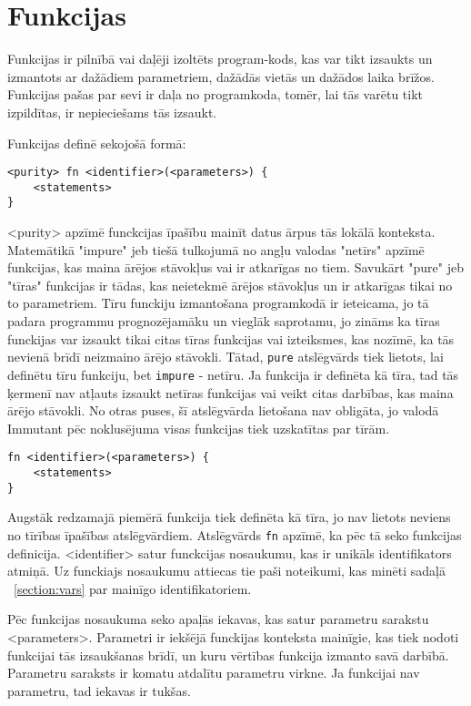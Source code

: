 \documentclass[12pt,a4paper]{report}
\begin{document}
\section{Funkcijas}
\label{section:functions}

Funkcijas ir pilnībā vai daļēji izoltēts program-kods, kas var tikt izsaukts un izmantots ar dažādiem parametriem, dažādās vietās un dažādos laika brīžos. Funkcijas pašas par sevi ir daļa no programkoda, tomēr, lai tās varētu tikt izpildītas, ir nepieciešams tās izsaukt. 

Funkcijas definē sekojošā formā:
\begin{verbatim}
<purity> fn <identifier>(<parameters>) {
    <statements>
}
\end{verbatim}

<purity> apzīmē funckcijas īpašību mainīt datus ārpus tās lokālā konteksta. Matemātikā "impure" jeb tiešā tulkojumā no angļu valodas "netīrs" apzīmē funkcijas, kas maina ārējos stāvokļus vai ir atkarīgas no tiem. Savukārt "pure" jeb "tīras" funkcijas ir tādas, kas neietekmē ārējos stāvokļus un ir atkarīgas tikai no to parametriem. Tīru funckiju izmantošana programkodā ir ieteicama, jo tā padara programmu prognozējamāku un vieglāk saprotamu, jo zināms ka tīras funckijas var izsaukt tikai citas tīras funkcijas vai izteiksmes, kas nozīmē, ka tās nevienā brīdī neizmaino ārējo stāvokli. Tātad, \texttt{pure} atslēgvārds tiek lietots, lai definētu tīru funkciju, bet \texttt{impure} - netīru. Ja funkcija ir definēta kā tīra, tad tās ķermenī nav atļauts izsaukt netīras funkcijas vai veikt citas darbības, kas maina ārējo stāvokli. No otras puses, šī atslēgvārda lietošana nav obligāta, jo valodā Immutant pēc noklusējuma visas funkcijas tiek uzskatītas par tīrām.

\begin{verbatim}
fn <identifier>(<parameters>) {
    <statements>
}
\end{verbatim}

Augstāk redzamajā piemērā funkcija tiek definēta kā tīra, jo nav lietots neviens no tīrības īpašības atslēgvārdiem. Atslēgvārds \texttt{fn} apzīmē, ka pēc tā seko funkcijas definicija. <identifier> satur funckcijas nosaukumu, kas ir unikāls identifikators atmiņā. Uz funckiajs nosaukumu attiecas tie paši noteikumi, kas minēti sadaļā ~\ref{section:vars} par mainīgo identifikatoriem.

Pēc funkcijas nosaukuma seko apaļās iekavas, kas satur parametru sarakstu <parameters>. Parametri ir iekšējā funckijas konteksta mainīgie, kas tiek nodoti funkcijai tās izsaukšanas brīdī, un kuru vērtības funkcija izmanto savā darbībā. Parametru saraksts ir komatu atdalītu parametru virkne. Ja funkcijai nav parametru, tad iekavas ir tukšas.
\end{document}
